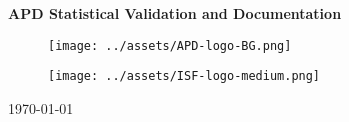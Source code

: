 \documentclass[12pt, letterpaper]{article}
\begin{document}
\thispagestyle{empty}
\begin{center}
	{\large \textbf{{APD Statistical Validation and Documentation}}} 


	\begin{figure}[th]
		\centering
		\texttt{[image: ../assets/APD-logo-BG.png]}
	\end{figure}

	\vspace{\fill}
	\begin{figure}[th]
		\centering
		\texttt{[image: ../assets/ISF-logo-medium.png]}
	\end{figure}

	\vspace{\fill}



	{\normalsize \today}


	

\end{center}

\newpage

\thispagestyle{empty}
\end{document}
